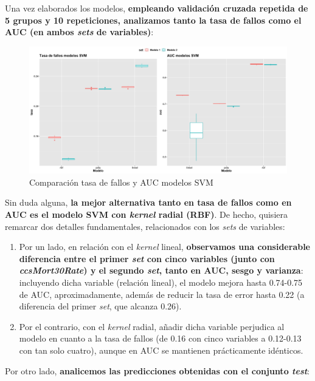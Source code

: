\documentclass[
]{article}
\begin{document}
Una vez elaborados los modelos, \textbf{empleando validación cruzada
repetida de 5 grupos y 10 repeticiones, analizamos tanto la tasa de
fallos como el AUC (en ambos \emph{sets} de variables)}:

\begin{figure}[h!]

{\centering \includegraphics[width=0.99\linewidth,height=0.99\textheight,]{./charts/SVM/comparacion_svm} 

}

\caption{Comparación tasa de fallos y AUC modelos SVM}\label{fig:unnamed-chunk-124}
\end{figure}

Sin duda alguna, \textbf{la mejor alternativa tanto en tasa de fallos
como en AUC es el modelo SVM con \emph{kernel} radial (RBF)}. De hecho,
quisiera remarcar dos detalles fundamentales, relacionados con los
\emph{sets} de variables:

\begin{enumerate}
\def\labelenumi{\arabic{enumi}.}
\item
  Por un lado, en relación con el \emph{kernel} lineal,
  \textbf{observamos una considerable diferencia entre el primer
  \emph{set} con cinco variables (junto con \emph{ccsMort30Rate}) y el
  segundo \emph{set}, tanto en AUC, sesgo y varianza}: incluyendo dicha
  variable (relación lineal), el modelo mejora hasta 0.74-0.75 de AUC,
  aproximadamente, además de reducir la tasa de error hasta 0.22 (a
  diferencia del primer \emph{set}, que alcanza 0.26).
\item
  Por el contrario, con el \emph{kernel} radial, añadir dicha variable
  perjudica al modelo en cuanto a la tasa de fallos (de 0.16 con cinco
  variables a 0.12-0.13 con tan solo cuatro), aunque en AUC se mantienen
  prácticamente idénticos.
\end{enumerate}

Por otro lado, \textbf{analicemos las predicciones obtenidas con el
conjunto \emph{test}}:
\end{document}
